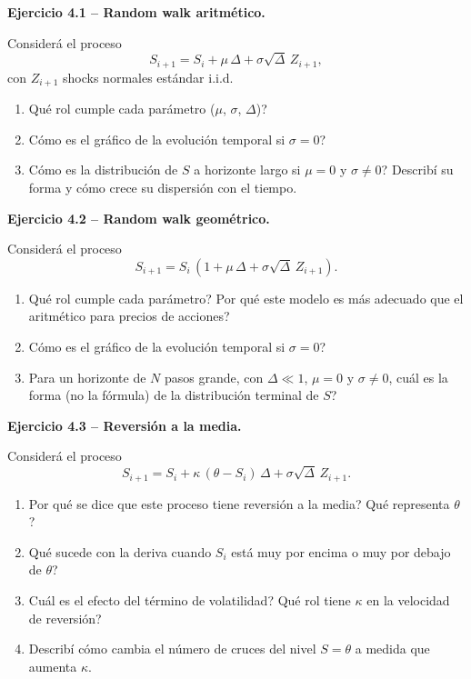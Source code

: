 \documentclass[11pt,a4paper]{article}
\newcommand{\ejercicio}[1]{\par\medskip\noindent\textbf{#1}\par\nopagebreak\smallskip}
\begin{document}
\ejercicio{Ejercicio 4.1 -- Random walk aritm\'etico.}
Consider\'a el proceso
\[
S_{i+1}=S_i+\mu\,\Delta+\sigma\sqrt{\Delta}\,Z_{i+1},
\]
con $Z_{i+1}$ shocks normales est\'andar i.i.d.
\begin{enumerate}[label=(\alph*)]
  \item \textquestiondown{}Qu\'e rol cumple cada par\'ametro ($\mu$, $\sigma$, $\Delta$)?
  \item \textquestiondown{}C\'omo es el gr\'afico de la evoluci\'on temporal si $\sigma=0$?
  \item \textquestiondown{}C\'omo es la distribuci\'on de $S$ a horizonte largo si $\mu=0$ y
        $\sigma\neq 0$? Describ\'i su forma y c\'omo crece su dispersi\'on con el tiempo.
\end{enumerate}

\ejercicio{Ejercicio 4.2 -- Random walk geom\'etrico.}
Consider\'a el proceso
\[
S_{i+1}=S_i\,(1+\mu\,\Delta+\sigma\sqrt{\Delta}\,Z_{i+1}).
\]
\begin{enumerate}[label=(\alph*)]
  \item \textquestiondown{}Qu\'e rol cumple cada par\'ametro? \textquestiondown{}Por qu\'e este modelo es m\'as adecuado
        que el aritm\'etico para precios de acciones?
  \item \textquestiondown{}C\'omo es el gr\'afico de la evoluci\'on temporal si $\sigma=0$?
  \item Para un horizonte de $N$ pasos grande, con $\Delta\ll 1$, $\mu=0$ y
        $\sigma\neq 0$, \textquestiondown{}cu\'al es la forma (no la f\'ormula) de la distribuci\'on
        terminal de $S$?
\end{enumerate}

\ejercicio{Ejercicio 4.3 -- Reversi\'on a la media.}
Consider\'a el proceso
\[
S_{i+1}=S_i+\kappa\,(\theta-S_i)\,\Delta+\sigma\sqrt{\Delta}\,Z_{i+1}.
\]
\begin{enumerate}[label=(\alph*)]
  \item \textquestiondown{}Por qu\'e se dice que este proceso tiene reversi\'on a la media? \textquestiondown{}Qu\'e
        representa $\theta$?
  \item \textquestiondown{}Qu\'e sucede con la deriva cuando $S_i$ est\'a muy por encima o muy por
        debajo de $\theta$?
  \item \textquestiondown{}Cu\'al es el efecto del t\'ermino de volatilidad? \textquestiondown{}Qu\'e rol tiene $\kappa$
        en la velocidad de reversi\'on?
  \item Describ\'i c\'omo cambia el n\'umero de cruces del nivel $S=\theta$ a medida que
        aumenta $\kappa$.
\end{enumerate}
\end{document}
